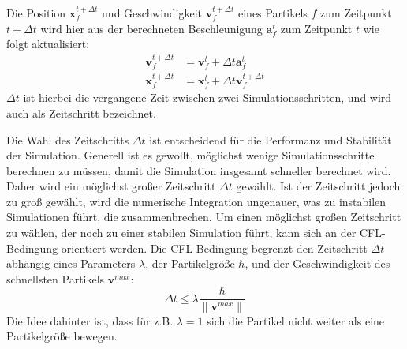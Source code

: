 \documentclass{scrreprt}
\begin{document}
Die Position $\textbf{x}_f^{t + \Delta t}$ und Geschwindigkeit $\textbf{v}_f^{t + \Delta t}$ eines Partikels $f$ zum Zeitpunkt $t + \Delta t$ 
wird hier aus der berechneten Beschleunigung $\textbf{a}_f^t$ zum Zeitpunkt $t$ wie folgt aktualisiert:
\begin{align}
    \textbf{v}_f^{t + \Delta t} &= \textbf{v}_f^t + \Delta t \textbf{a}_f^t\\
    \textbf{x}_f^{t + \Delta t} &= \textbf{x}_f^t + \Delta t \textbf{v}_f^{t + \Delta t}
\end{align}
$\Delta t$ ist hierbei die vergangene Zeit zwischen zwei Simulationsschritten, und wird auch als Zeitschritt bezeichnet.

Die Wahl des Zeitschritts $\Delta t$ ist entscheidend für die Performanz und Stabilität der Simulation.
Generell ist es gewollt, möglichst wenige Simulationsschritte berechnen zu müssen, damit die Simulation insgesamt schneller berechnet wird.
Daher wird ein möglichst großer Zeitschritt $\Delta t$ gewählt.
Ist der Zeitschritt jedoch zu groß gewählt, wird die numerische Integration ungenauer, was zu instabilen Simulationen führt, die zusammenbrechen.
Um einen möglichst großen Zeitschritt zu wählen, der noch zu einer stabilen Simulation führt, kann sich an der CFL-Bedingung orientiert werden.
Die CFL-Bedingung begrenzt den Zeitschritt $\Delta t$ abhängig eines Parameters $\lambda$, 
der Partikelgröße $\hbar$, und der Geschwindigkeit des schnellsten Partikels $\textbf{v}^{max}$:
\begin{equation}
    \Delta t \leq \lambda \frac{\hbar}{\|\textbf{v}^{max}\| }
\end{equation}
Die Idee dahinter ist, dass für z.B. $\lambda = 1$ sich die Partikel nicht weiter als eine Partikelgröße bewegen. \cite{koschier_smoothed_2020}
\end{document}
